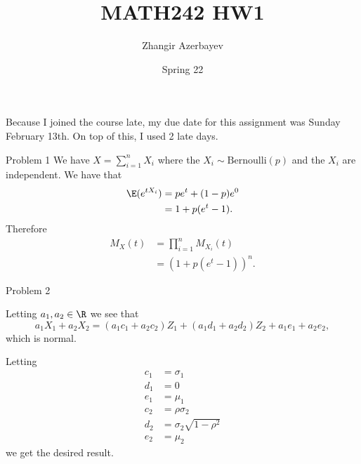 \documentclass{article}
\title{MATH242 HW1}
\author{Zhangir Azerbayev}
\date{Spring 22}
\begin{document}
\maketitle

Because I joined the course late, my due date for this assignment was Sunday February 13th. 
On top of this, I used 2 late days. 
\begin{question}{Problem 1}
    We have $X = \sum_{i=1}^n X_i$ where the $X_i \sim \mathrm{Bernoulli}(p)$ and the $X_i$ are independent. We have that 
    \begin{align*}
        \E(e^{tX_i}) &= pe^t + (1-p)e^0\\
                     &= 1 + p(e^t-1). 
    \end{align*}
    Therefore 
    \begin{align*}
        M_X(t) &= \prod_{i=1}^n M_{X_i}(t)\\
               &= \left(1+p(e^t-1)\right)^n. 
    \end{align*}
\end{question}

\begin{question}{Problem 2}
    \begin{part}
        Letting $a_1, a_2\in \R$ we see that 
        \[a_1X_1 + a_2X_2 = (a_1c_1+a_2c_2)Z_1 + (a_1d_1+a_2d_2)Z_2 + a_1e_1 + a_2e_2,\]
        which is normal. 
    \end{part}
    \begin{part}
        Letting 
        \begin{align*}
            c_1 &= \sigma_1\\
            d_1 &= 0 \\
            e_1 &= \mu_1\\
            c_2 &= \rho\sigma_2\\
            d_2 &= \sigma_2\sqrt{1-\rho^2}\\
            e_2 &= \mu_2
        \end{align*}
        we get the desired result. 
    \end{part}
\end{question}
\end{document}
